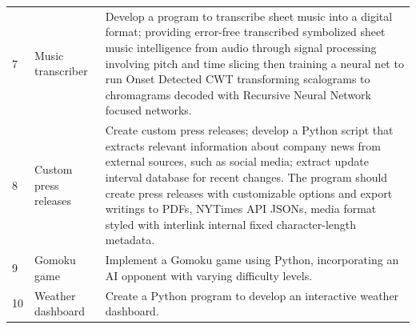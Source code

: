 \begin{table}[htb]
{\begin{tabular}{llp{18.5cm}}
\hline
7 & Music transcriber & Develop a program to transcribe sheet music into a digital format; providing error-free transcribed symbolized sheet music intelligence from audio through signal processing involving pitch and time slicing then training a neural net to run Onset Detected CWT transforming scalograms to chromagrams decoded with Recursive Neural Network focused networks. \\ %
8 & Custom press releases & Create custom press releases; develop a Python script that extracts relevant information about company news from external sources, such as social media; extract update interval database for recent changes. The program should create press releases with customizable options and export writings to PDFs, NYTimes API JSONs, media format styled with interlink internal fixed character-length metadata. \\ %
9 & Gomoku game & Implement a Gomoku game using Python, incorporating an AI opponent with varying difficulty levels. \\ %
10 & Weather dashboard & Create a Python program to develop an interactive weather dashboard. \\ 
\hline

\hline

\hline

\hline

\hline
\end{tabular}
}
\end{table}